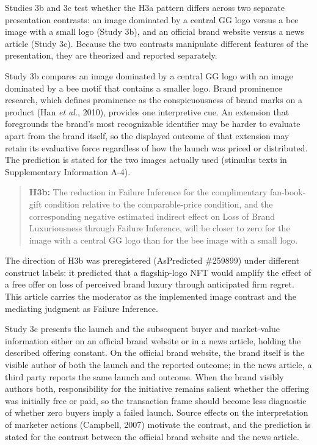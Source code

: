 \documentclass[12pt, a4paper]{article}
\begin{document}
Studies 3b and 3c test whether the H3a pattern differs across two separate presentation contrasts: an image dominated by a central GG logo versus a bee image with a small logo (Study 3b), and an official brand website versus a news article (Study 3c). Because the two contrasts manipulate different features of the presentation, they are theorized and reported separately.

Study 3b compares an image dominated by a central GG logo with an image dominated by a bee motif that contains a smaller logo. Brand prominence research, which defines prominence as the conspicuousness of brand marks on a product (Han \emph{et al.}, 2010), provides one interpretive cue. An extension that foregrounds the brand's most recognizable identifier may be harder to evaluate apart from the brand itself, so the displayed outcome of that extension may retain its evaluative force regardless of how the launch was priced or distributed. The prediction is stated for the two images actually used (stimulus texts in Supplementary Information A-4).

\begin{quote}
\textbf{H3b:} The reduction in Failure Inference for the complimentary fan-book-gift condition relative to the comparable-price condition, and the corresponding negative estimated indirect effect on Loss of Brand Luxuriousness through Failure Inference, will be closer to zero for the image with a central GG logo than for the bee image with a small logo.
\end{quote}

The direction of H3b was preregistered (AsPredicted \#259899) under different construct labels: it predicted that a flagship-logo NFT would amplify the effect of a free offer on loss of perceived brand luxury through anticipated firm regret. This article carries the moderator as the implemented image contrast and the mediating judgment as Failure Inference.

Study 3c presents the launch and the subsequent buyer and market-value information either on an official brand website or in a news article, holding the described offering constant. On the official brand website, the brand itself is the visible author of both the launch and the reported outcome; in the news article, a third party reports the same launch and outcome. When the brand visibly authors both, responsibility for the initiative remains salient whether the offering was initially free or paid, so the transaction frame should become less diagnostic of whether zero buyers imply a failed launch. Source effects on the interpretation of marketer actions (Campbell, 2007) motivate the contrast, and the prediction is stated for the contrast between the official brand website and the news article.
\end{document}
